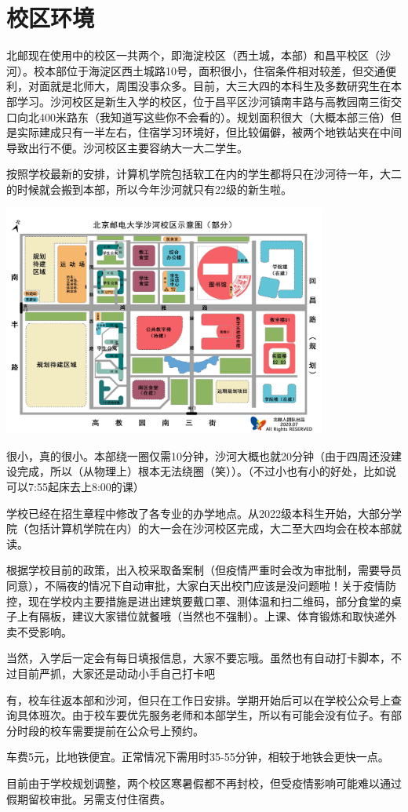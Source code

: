 \section{校区环境}

北邮现在使用中的校区一共两个，即海淀校区（西土城，本部）和昌平校区（沙河）。校本部位于海淀区西土城路10号，面积很小，住宿条件相对较差，但交通便利，对面就是北师大，周围没事众多。目前，大三大四的本科生及多数研究生在本部学习。沙河校区是新生入学的校区，位于昌平区沙河镇南丰路{\small{}与高教园南三街交口向北400米路东（我知道写这些你不会看的）}。规划面积很大（大概本部三倍）但是实际建成只有一半左右，住宿学习环境好，但比较偏僻，被两个地铁站夹在中间导致出行不便。沙河校区主要容纳大一大二学生。

按照学校最新的安排，计算机学院包括软工在内的学生都将只在沙河待一年，大二的时候就会搬到本部，所以今年沙河就只有22级的新生啦。

\begin{center}
    \includegraphics[width=0.80\textwidth]{images/shahe-map.png}
\end{center}


很小，真的很小。本部绕一圈仅需10分钟，沙河大概也就20分钟（由于四周还没建设完成，所以（从物理上）根本无法绕圈（笑））。{\small （不过小也有小的好处，比如说可以7:55起床去上8:00的课）}


学校已经在招生章程中修改了各专业的办学地点。从2022级本科生开始，大部分学院（包括计算机学院在内）的大一会在沙河校区完成，大二至大四均会在校本部就读。


根据学校目前的政策，出入校采取备案制（但疫情严重时会改为审批制，需要导员同意），不隔夜的情况下自动审批，大家白天出校门应该是没问题啦！关于疫情防控，现在学校内主要措施是进出建筑要戴口罩、测体温和扫二维码，部分食堂的桌子上有隔板，建议大家错位就餐哦（当然也不强制）。上课、体育锻炼和取快递外卖不受影响。

当然，入学后一定会有每日填报信息，大家不要忘哦。虽然也有自动打卡脚本，不过目前严抓，大家还是动动小手自己打卡吧~


有，校车往返本部和沙河，但只在工作日安排。学期开始后可以在学校公众号上查询具体班次。由于校车要优先服务老师和本部学生，所以有可能会没有位子。有部分时段的校车需要提前在公众号上预约。

车费5元，比地铁便宜。正常情况下需用时35-55分钟，相较于地铁会更快一点。


目前由于学校规划调整，两个校区寒暑假都不再封校，但受疫情影响可能难以通过假期留校审批。另需支付住宿费。
